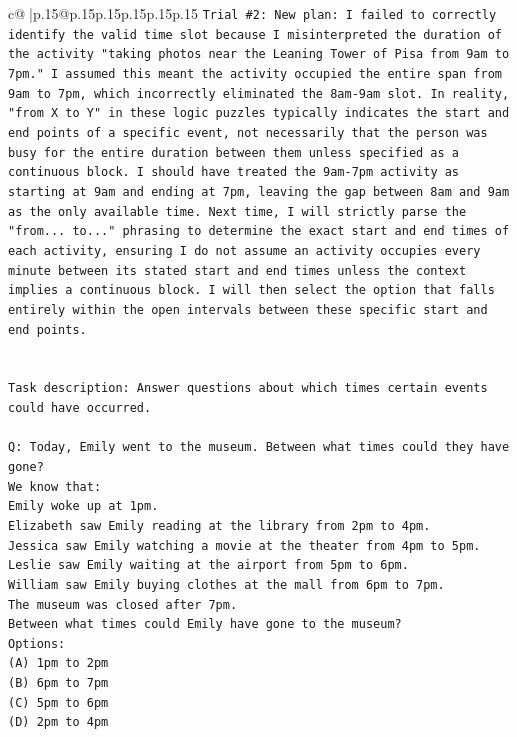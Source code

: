 \documentclass{article}
\begin{document}
{\begin{supertabular}{c@{$\;$}|p{.15\linewidth}@{}p{.15\linewidth}p{.15\linewidth}p{.15\linewidth}p{.15\linewidth}p{.15\linewidth}}
{{{\texttt{Trial \#2: New plan: I failed to correctly identify the valid time slot because I misinterpreted the duration of the activity "taking photos near the Leaning Tower of Pisa from 9am to 7pm." I assumed this meant the activity occupied the entire span from 9am to 7pm, which incorrectly eliminated the 8am{-}9am slot. In reality, "from X to Y" in these logic puzzles typically indicates the start and end points of a specific event, not necessarily that the person was busy for the entire duration between them unless specified as a continuous block. I should have treated the 9am{-}7pm activity as starting at 9am and ending at 7pm, leaving the gap between 8am and 9am as the only available time. Next time, I will strictly parse the "from... to..." phrasing to determine the exact start and end times of each activity, ensuring I do not assume an activity occupies every minute between its stated start and end times unless the context implies a continuous block. I will then select the option that falls entirely within the open intervals between these specific start and end points.} \\
\\ 
\\ 
\texttt{Task description: Answer questions about which times certain events could have occurred.} \\
\\ 
\texttt{Q: Today, Emily went to the museum. Between what times could they have gone?} \\
\texttt{We know that:} \\
\texttt{Emily woke up at 1pm.} \\
\texttt{Elizabeth saw Emily reading at the library from 2pm to 4pm.} \\
\texttt{Jessica saw Emily watching a movie at the theater from 4pm to 5pm.} \\
\texttt{Leslie saw Emily waiting at the airport from 5pm to 6pm.} \\
\texttt{William saw Emily buying clothes at the mall from 6pm to 7pm.} \\
\texttt{The museum was closed after 7pm.} \\
\texttt{Between what times could Emily have gone to the museum?} \\
\texttt{Options:} \\
\texttt{(A) 1pm to 2pm} \\
\texttt{(B) 6pm to 7pm} \\
\texttt{(C) 5pm to 6pm} \\
\texttt{(D) 2pm to 4pm} \\
}}}
\end{supertabular}}
\end{document}
